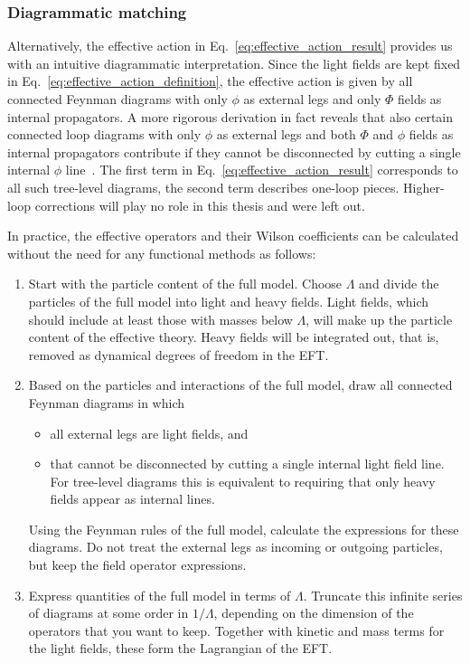   
\subsubsection{Diagrammatic matching}

Alternatively, the effective action in
Eq.~\eqref{eq:effective_action_result} provides us with an intuitive
diagrammatic interpretation.  Since the light fields are kept fixed in
Eq.~\eqref{eq:effective_action_definition}, the effective action is
given by all connected Feynman diagrams with only $\phi$ as external
legs and only $\Phi$ fields as internal propagators. A more rigorous
derivation in fact reveals that also certain connected loop diagrams
with only $\phi$ as external legs and both $\Phi$ and $\phi$ fields as
internal propagators contribute if they cannot be disconnected by
cutting a single internal $\phi$ line~\cite{Henning:2016lyp}. The
first term in Eq.~\eqref{eq:effective_action_result} corresponds to
all such tree-level diagrams, the second term describes one-loop
pieces. Higher-loop corrections will play no role in this thesis and
were left out.

In practice, the effective operators and their Wilson coefficients can
be calculated without the need for any functional methods as follows:
%
\begin{enumerate}
\item Start with the particle content of the full model. Choose
  $\Lambda$ and divide the particles of the full model into light and
  heavy fields. Light fields, which should include at least those with
  masses below $\Lambda$, will make up the particle content of the
  effective theory. Heavy fields will be integrated out, that
  is, removed as dynamical degrees of freedom in the EFT.
%
\item Based on the particles and interactions of the full model, draw
  all connected Feynman diagrams in which
%
  \begin{itemize}
    \item all external legs are light fields, and
    \item that cannot be disconnected by cutting a single internal
      light field line. For tree-level diagrams this is equivalent to
      requiring that only heavy fields appear as internal lines.
  \end{itemize}
%
  Using the Feynman rules of the full model, calculate the expressions
  for these diagrams. Do not treat the external legs as incoming or
  outgoing particles, but keep the field operator expressions.
%
\item Express quantities of the full model in terms of
  $\Lambda$. Truncate this infinite series of diagrams at some order
  in $1/\Lambda$, depending on the dimension of the operators that you
  want to keep. Together with kinetic and mass terms for the light
  fields, these form the Lagrangian of the EFT.
\end{enumerate}



